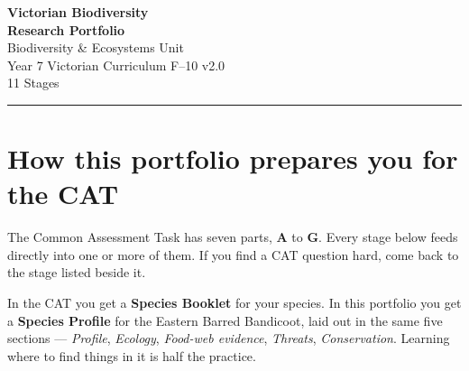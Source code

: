 \documentclass[11pt,a4paper]{article}
\begin{document}
\thispagestyle{plain}

\begin{center}
  \vspace*{0.5cm}
  {\headingfont\bfseries\color{ForestDark}\fontsize{28}{32}\selectfont
   Victorian Biodiversity\\Research Portfolio}\\[10pt]
  {\headingfont\color{Forest}\Large Biodiversity \& Ecosystems Unit}\\[6pt]
  {\color{DarkGrey}\large Year 7 \textbar{} Victorian Curriculum F--10 v2.0}\\[4pt]
  {\color{MidGrey} 11 Stages}
  \vspace{14pt}
  \textcolor{Line}{\rule{\linewidth}{1.5pt}}
\end{center}

\bigskip

\section*{How this portfolio prepares you for the CAT}

{\small The Common Assessment Task has seven parts, \textbf{A} to \textbf{G}. Every stage below feeds directly into one or more of them. If you find a CAT question hard, come back to the stage listed beside it.

\medskip
In the CAT you get a \textbf{Species Booklet} for your species. In this portfolio you get a \textbf{Species Profile} for the Eastern Barred Bandicoot, laid out in the same five sections --- \emph{Profile}, \emph{Ecology}, \emph{Food-web evidence}, \emph{Threats}, \emph{Conservation}. Learning where to find things in it is half the practice.}

\medskip
\end{document}
